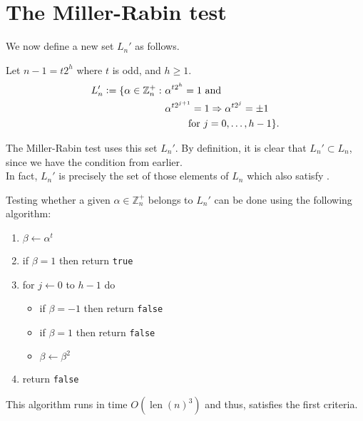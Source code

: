 \documentclass[12pt]{article}
\DeclareMathOperator{\len}{len}
\begin{document}
\section{The Miller-Rabin test}


    We now define a new set $L_{n}'$ as follows. 
    \begin{defn}
        Let $n - 1 = t 2^{h}$  where $t$ is odd, and $h \ge 1$. 
        \begin{align} 
            L_{n}' \vcentcolon= \{\alpha \in \mathbb{Z}_{n}^{+} :\ &\alpha^{t2^{h}} = 1 \text{ and} \nonumber \\
            & \alpha^{t2^{j + 1}} = 1 \Rightarrow \alpha^{t2^{j}} = \pm 1 \label{eq:sepia}\\
            & \qquad \text{ for } j = 0, \ldots, h - 1\}. \nonumber
        \end{align}
    \end{defn}
      
    The Miller-Rabin test uses this set $L_{n}'$.  By definition, it is clear that $L_{n}' \subset L_{n}$, since we have the condition  from earlier.  \\
    In fact, $L_{n}'$ is precisely the set of those elements of $L_{n}$ which also satisfy .



    Testing whether a given $\alpha \in \mathbb{Z}_{n}^{+}$ belongs to $L_{n}'$ can be done using the following algorithm: 
    \begin{algo} \phantom{hi} 
        \begin{enumerate}
            \itemsep1mm
            \item $\beta \leftarrow \alpha^{t}$
            \item if $\beta = 1$ then return \texttt{true}
            \item for $j \leftarrow 0$ to $h - 1$ do
            \begin{itemize}
                \item if $\beta = -1$ then return \texttt{false}
                \item if $\beta = 1$ then return \texttt{false}
                \item $\beta \leftarrow \beta^{2}$
            \end{itemize}
            \item return \texttt{false}
        \end{enumerate}
    \end{algo}
     This algorithm runs in time $O(\len(n)^{3})$ and thus, satisfies the first criteria.
\end{document}

